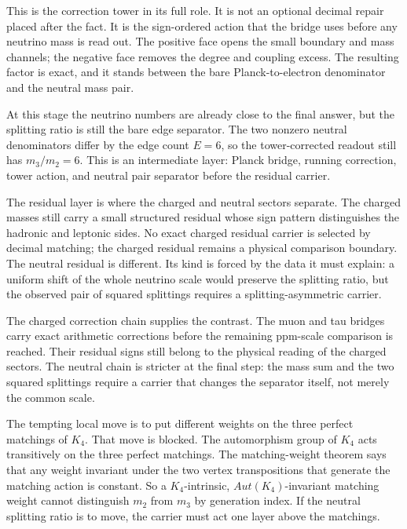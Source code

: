 \documentclass[11pt,a4paper]{book}
\def\mathrm#1{#1}%
\begin{document}
This is the correction tower in its full role.  It is not an optional decimal
repair placed after the fact.  It is the sign-ordered action that the bridge
uses before any neutrino mass is read out.  The positive face opens the small
boundary and mass channels; the negative face removes the degree and coupling
excess.  The resulting factor is exact, and it stands between the bare
Planck-to-electron denominator and the neutral mass pair.

At this stage the neutrino numbers are already close to the final answer, but
the splitting ratio is still the bare edge separator.  The two nonzero
neutral denominators differ by the edge count $E=6$, so the tower-corrected
readout still has $m_3/m_2=6$.  This is an intermediate layer: Planck bridge,
running correction, tower action, and neutral pair separator before the
residual carrier.

The residual layer is where the charged and neutral sectors separate.  The
charged masses still carry a small structured residual whose sign pattern
distinguishes the hadronic and leptonic sides.  No exact charged residual
carrier is selected by decimal matching; the charged residual remains a
physical comparison boundary.  The neutral residual is different.  Its kind
is forced by the data it must explain: a uniform shift of the whole neutrino
scale would preserve the splitting ratio, but the observed pair of squared
splittings requires a splitting-asymmetric carrier.

The charged correction chain supplies the contrast.  The muon and tau bridges
carry exact arithmetic corrections before the remaining ppm-scale comparison
is reached.  Their residual signs still belong to the physical reading of the
charged sectors.  The neutral chain is stricter at the final step: the mass
sum and the two squared splittings require a carrier that changes the
separator itself, not merely the common scale.

The tempting local move is to put different weights on the three perfect
matchings of $K_4$.  That move is blocked.  The automorphism group of $K_4$
acts transitively on the three perfect matchings.  The matching-weight theorem
says that any weight invariant under the two vertex transpositions that
generate the matching action is constant.  So a $K_4$-intrinsic,
$\mathrm{Aut}(K_4)$-invariant matching weight cannot distinguish $m_2$ from
$m_3$ by generation index.  If the neutral splitting ratio is to move, the
carrier must act one layer above the matchings.
\end{document}
